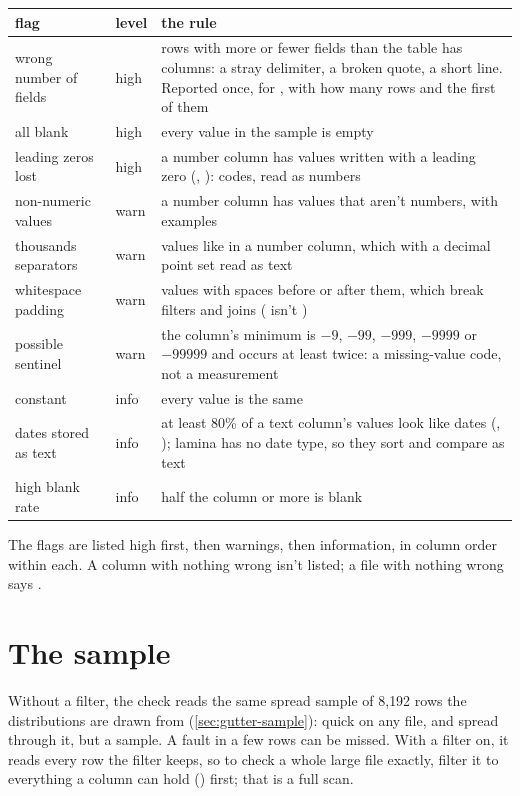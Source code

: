 \begin{center}\small
\begin{tabularx}{\linewidth}{@{}llL@{}}
\toprule
\sffamily\bfseries flag & \sffamily\bfseries level & \sffamily\bfseries the rule \\
\midrule
wrong number of fields & high & rows with more or fewer fields than the table has columns: a stray
delimiter, a broken quote, a short line. Reported once, for , with how many rows and
the first of them \\
all blank & high & every value in the sample is empty \\
leading zeros lost & high & a number column has values written with a leading zero (,
): codes, read as numbers \\
non-numeric values & warn & a number column has values that aren't numbers, with examples \\
thousands separators & warn & values like  in a number column, which with a decimal point
set read as text \\
whitespace padding & warn & values with spaces before or after them, which break filters and joins
( isn't ) \\
possible sentinel & warn & the column's minimum is $-9$, $-99$, $-999$, $-9999$ or $-99999$ and occurs at
least twice: a missing-value code, not a measurement \\
constant & info & every value is the same \\
dates stored as text & info & at least 80\% of a text column's values look like dates
(, ); lamina has no date type, so they sort and compare as text \\
high blank rate & info & half the column or more is blank \\
\bottomrule
\end{tabularx}
\end{center}

The flags are listed high first, then warnings, then information, in column order within each. A column
with nothing wrong isn't listed; a file with nothing wrong says .

\section{The sample}\label{sec:dq-sample}

Without a filter, the check reads the same spread sample of 8{,}192 rows the distributions are drawn from
(\cref{sec:gutter-sample}): quick on any file, and spread through it, but a sample. A fault in a few rows
can be missed. With a filter on, it reads every row the filter keeps, so to check a whole large file
exactly, filter it to everything a column can hold () first; that is a full scan.

